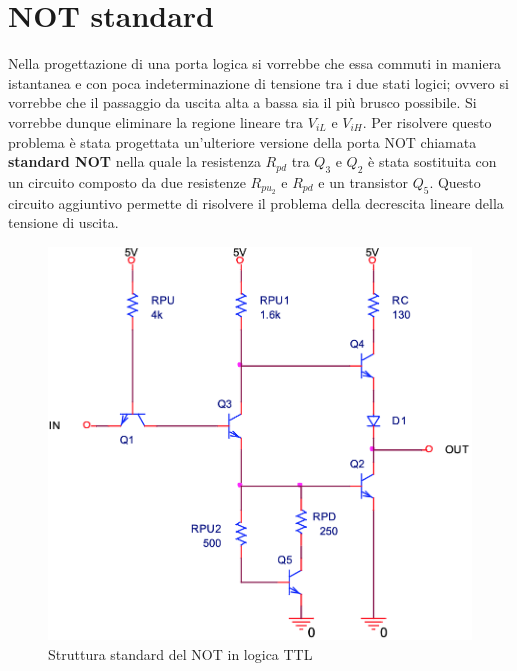 \documentclass[12pt, a4paper]{report}
\begin{document}
\section{NOT standard}
Nella progettazione di una porta logica si vorrebbe che essa commuti in maniera istantanea e con poca indeterminazione di tensione tra i due stati logici; ovvero si vorrebbe che il passaggio da uscita alta a bassa sia il più brusco possibile. Si vorrebbe dunque eliminare la regione lineare tra $V_{iL}$ e $V_{iH}$. Per risolvere questo problema è stata progettata un'ulteriore versione della porta NOT chiamata \textbf{standard NOT} nella quale la resistenza $R_{pd}$ tra $Q_3$ e $Q_2$ è stata sostituita con un circuito composto da due resistenze $R_{pu_2}$ e $R_{pd}$ e un transistor $Q_5$. Questo circuito aggiuntivo permette di risolvere il problema della decrescita lineare della tensione di uscita.
\begin{figure}[h]
    \centering
    \includegraphics[scale=0.4,angle=0]{ttl_not_std.png}
    \caption{Struttura standard del NOT in logica TTL}
    \label{not_std}
\end{figure}
\end{document}
